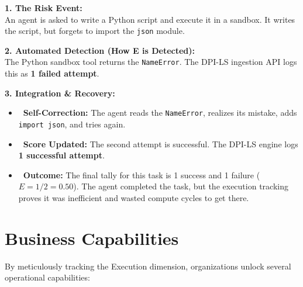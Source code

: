 \documentclass[11pt,a4paper]{article}
\begin{document}
\begin{tcolorbox}[enhanced, colback=gray!5!white, colframe=gray, title={\textbf{\faSync\ Scenario 3: The Seamless Self-Correction}}, fonttitle=\bfseries, boxrule=1pt, arc=2mm]
\textbf{\color{dpired} 1. The Risk Event:}\\
An agent is asked to write a Python script and execute it in a sandbox. It writes the script, but forgets to import the \texttt{json} module.

\vspace{0.2cm}
\textbf{\color{dpicloud} 2. Automated Detection (How E is Detected):}\\
The Python sandbox tool returns the \texttt{NameError}. The DPI-LS ingestion API logs this as \textbf{1 failed attempt}.

\vspace{0.2cm}
\textbf{\color{dpigreen} 3. Integration \& Recovery:}\\
\begin{itemize}
    \item \textbf{\color{gray}\faWrench\ Self-Correction:} The agent reads the \texttt{NameError}, realizes its mistake, adds \texttt{import json}, and tries again.
    \item \textbf{\color{gray}\faSortNumericUp\ Score Updated:} The second attempt is successful. The DPI-LS engine logs \textbf{1 successful attempt}.
    \item \textbf{\color{gray}\faClipboardCheck\ Outcome:} The final tally for this task is 1 success and 1 failure ($E = 1/2 = 0.50$). The agent completed the task, but the execution tracking proves it was inefficient and wasted compute cycles to get there.
\end{itemize}
\end{tcolorbox}

\vspace{0.5cm}

\section{Business Capabilities}

By meticulously tracking the Execution dimension, organizations unlock several operational capabilities:
\end{document}
